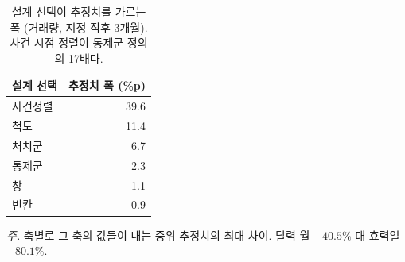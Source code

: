 \begin{table}[htbp]
  \centering
  \caption{설계 선택이 추정치를 가르는 폭 (거래량, 지정 직후 3개월). 사건 시점 정렬이 통제군 정의의 17배다.}
  \label{tab:rq4-axes}
  \begin{tabular}{lr}
    \toprule
    \textbf{설계 선택} & \textbf{추정치 폭 (\%p)} \\
    \midrule
    사건정렬 & 39.6 \\
    척도 & 11.4 \\
    처치군 & 6.7 \\
    통제군 & 2.3 \\
    창 & 1.1 \\
    빈칸 & 0.9 \\
    \bottomrule
  \end{tabular}

  \begin{minipage}{\linewidth}\footnotesize
  \textit{주.} 축별로 그 축의 값들이 내는 중위 추정치의 최대 차이. 달력 월 $-40.5\%$ 대 효력일 $-80.1\%$.
  \end{minipage}
\end{table}
